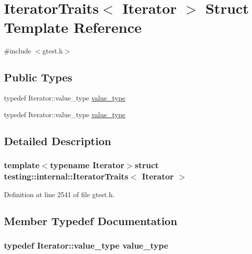 \hypertarget{structtesting_1_1internal_1_1IteratorTraits}{\section{\-Iterator\-Traits$<$ \-Iterator $>$ \-Struct \-Template \-Reference}
\label{d5/dc7/structtesting_1_1internal_1_1IteratorTraits}
}


{\ttfamily \#include $<$gtest.\-h$>$}

\subsection*{\-Public \-Types}
\begin{DoxyCompactItemize}
\item 
typedef \-Iterator\-::value\-\_\-type \hyperlink{structtesting_1_1internal_1_1IteratorTraits_a2c72bd0c215dc4f0dc7f1b98869fee3d}{value\-\_\-type}
\item 
typedef \-Iterator\-::value\-\_\-type \hyperlink{structtesting_1_1internal_1_1IteratorTraits_a2c72bd0c215dc4f0dc7f1b98869fee3d}{value\-\_\-type}
\end{DoxyCompactItemize}


\subsection{\-Detailed \-Description}
\subsubsection*{template$<$typename \-Iterator$>$struct testing\-::internal\-::\-Iterator\-Traits$<$ Iterator $>$}



\-Definition at line 2541 of file gtest.\-h.



\subsection{\-Member \-Typedef \-Documentation}
\hypertarget{structtesting_1_1internal_1_1IteratorTraits_a2c72bd0c215dc4f0dc7f1b98869fee3d}{
\subsubsection[{value\-\_\-type}]{\setlength{\rightskip}{0pt plus 5cm}typedef \-Iterator\-::value\-\_\-type {\bf value\-\_\-type}}}\label{d5/dc7/structtesting_1_1internal_1_1IteratorTraits_a2c72bd0c215dc4f0dc7f1b98869fee3d}



